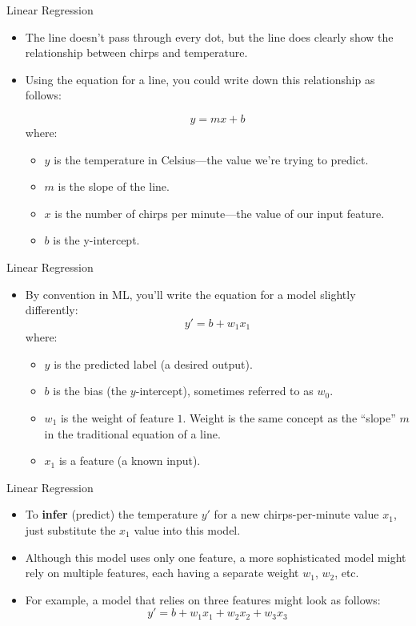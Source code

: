 \documentclass{beamer}
\begin{document}
\begin{frame}{Linear Regression}
\begin{itemize}
    \item The line doesn't pass through every dot, but the line does clearly show the relationship between chirps and temperature. 
    \item Using the equation for a line, you could write down this relationship as follows:
    
    $$y = m x + b$$
    where:
    \begin{itemize}
        \item $y$ is the temperature in Celsius—the value we're trying to predict.
        \item $m$ is the slope of the line.
        \item $x$ is the number of chirps per minute—the value of our input feature.
        \item $b$ is the y-intercept.
    \end{itemize}
\end{itemize}
\end{frame}

\begin{frame}{Linear Regression}
\begin{itemize}
    \item By convention in ML, you'll write the equation for a model slightly differently:
    $$y' = b + w_1 x_1$$
    where:
    \begin{itemize}
        \item $y$ is the predicted label (a desired output).
        \item $b$ is the bias (the $y$-intercept), sometimes referred to as $w_0$.
        \item $w_1$ is the weight of feature $1$. Weight is the same concept as the ``slope'' $m$ in the traditional equation of a line.
        \item $x_1$ is a feature (a known input).
    \end{itemize}
\end{itemize}
\end{frame}

\begin{frame}{Linear Regression}
\begin{itemize}
    \item To {\bf infer} (predict) the temperature $y'$ for a new chirps-per-minute value $x_1$, just substitute the $x_1$ value into this model.
    
    \item Although this model uses only one feature, a more sophisticated model might rely on multiple features, each having a separate weight $w_1$, $w_2$, etc. 
    
    \item For example, a model that relies on three features might look as follows:
    $$ y' = b + w_1 x_1 + w_2 x_2 + w_3 x_3 $$
\end{itemize}
\end{frame}
\end{document}
